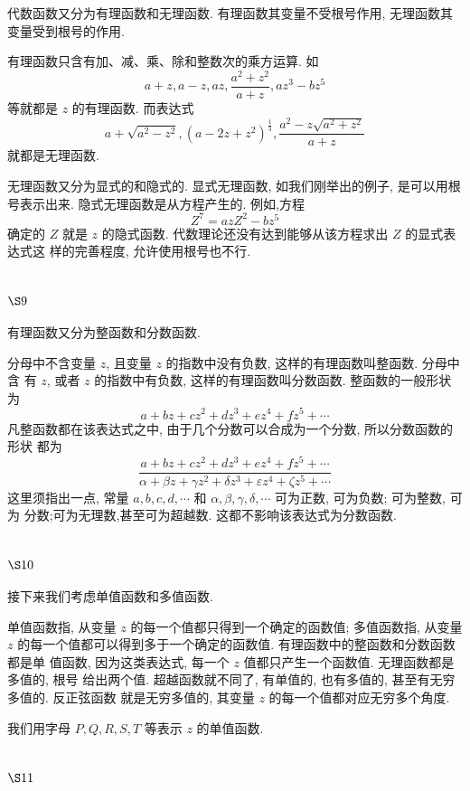 代数函数又分为有理函数和无理函数. 有理函数其变量不受根号作用, 无理函数其 变量受到根号的作用.

有理函数只含有加、减、乘、除和整数次的乘方运算. 如
\[
a+z, a-z, a z, \frac{a^{2}+z^{2}}{a+z}, a z^{3}-b z^{5}
\]
等就都是 $z$ 的有理函数. 而表达式
\[
a+\sqrt{a^{2}-z^{2}},\left(a-2 z+z^{2}\right)^{\frac{1}{3}}, \frac{a^{2}-z \sqrt{a^{2}+z^{2}}}{a+z}
\]
就都是无理函数.

无理函数又分为显式的和隐式的. 显式无理函数, 如我们刚举出的例子, 是可以用根 号表示出来. 隐式无理函数是从方程产生的. 例如,方程
\[
Z^{7}=a z Z^{2}-b z^{5}
\]
确定的 $Z$ 就是 $z$ 的隐式函数. 代数理论还没有达到能够从该方程求出 $Z$ 的显式表达式这 样的完善程度, 允许使用根号也不行.

\section{$\S 9$}

有理函数又分为整函数和分数函数.

分母中不含变量 $z$, 且变量 $z$ 的指数中没有负数, 这样的有理函数叫整函数. 分母中含 有 $z$, 或者 $z$ 的指数中有负数, 这样的有理函数叫分数函数. 整函数的一般形状为
\[
a+b z+c z^{2}+d z^{3}+e z^{4}+f z^{5}+\cdots
\]
凡整函数都在该表达式之中, 由于几个分数可以合成为一个分数, 所以分数函数的形状 都为
\[
\frac{a+b z+c z^{2}+d z^{3}+e z^{4}+f z^{5}+\cdots}{\alpha+\beta z+\gamma z^{2}+\delta z^{3}+\varepsilon z^{4}+\zeta z^{5}+\cdots}
\]
这里须指出一点, 常量 $a, b, c, d, \cdots$ 和 $\alpha, \beta, \gamma, \delta, \cdots$ 可为正数, 可为负数; 可为整数, 可为 分数;可为无理数,甚至可为超越数. 这都不影响该表达式为分数函数. 

\section{$\S 10$}
接下来我们考虑单值函数和多值函数.

单值函数指, 从变量 $z$ 的每一个值都只得到一个确定的函数值; 多值函数指, 从变量 $z$ 的每一个值都可以得到多于一个确定的函数值. 有理函数中的整函数和分数函数都是单 值函数, 因为这类表达式, 每一个 $z$ 值都只产生一个函数值. 无理函数都是多值的, 根号 给出两个值. 超越函数就不同了, 有单值的, 也有多值的, 甚至有无穷多值的. 反正弦函数 就是无穷多值的, 其变量 $z$ 的每一个值都对应无穷多个角度.

我们用字母 $P, Q, R, S, T$ 等表示 $z$ 的单值函数.

\section{$\S 11$}

